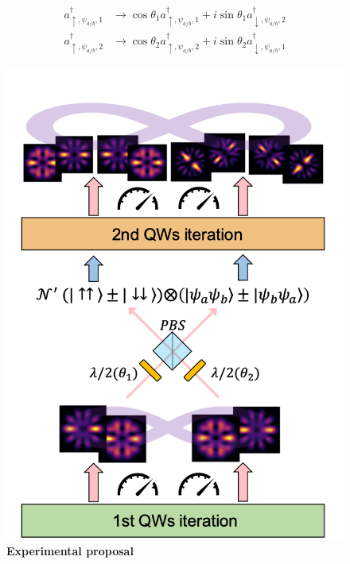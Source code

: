 \documentclass[
	aps, pra,
	superscriptaddress, twocolumn,
	floatfix,
	10pt
]{revtex4-1}
\begin{document}
\begin{equation}\begin{aligned}
    a^{\dagger}_{\uparrow, \psi_{a/b},1} & \rightarrow \cos{\theta_1}a^{\dagger}_{\uparrow, \psi_{a/b},1} + i\sin{\theta_1}a^{\dagger}_{\downarrow, \psi_{a/b},2} \\
    a^{\dagger}_{\uparrow, \psi_{a/b},2} & \rightarrow \cos{\theta_2}a^{\dagger}_{\uparrow, \psi_{a/b},2} + i\sin{\theta_2}a^{\dagger}_{\downarrow, \psi_{a/b},1}
\end{aligned}\end{equation}

\begin{figure}[t]
    \centering
    \includegraphics[scale= 0.45]{exp_ent_acc.png}
    \caption{\textbf{Experimental proposal}}
    \label{fig:exp_ent_acc}
\end{figure}
\end{document}
